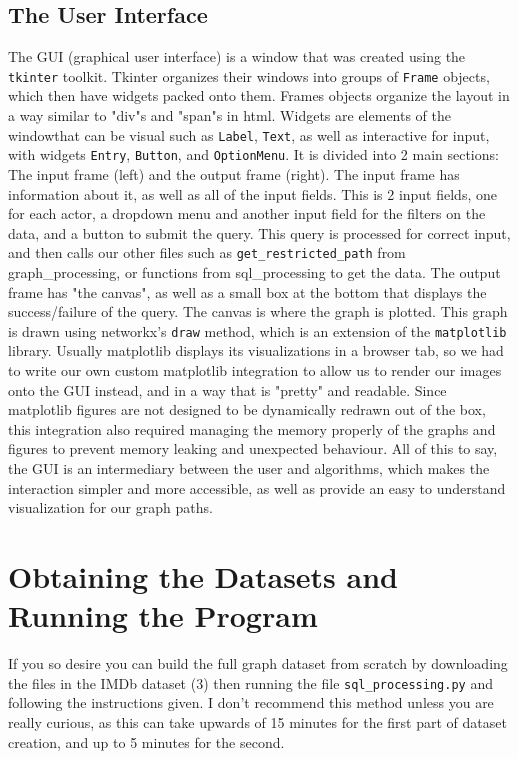 \documentclass{article}
\begin{document}
\subsection{The User Interface}
The GUI (graphical user interface) is a window that was created using the \verb!tkinter! toolkit. Tkinter organizes their windows into groups of \verb!Frame! objects, which then have widgets packed onto them. Frames objects organize the layout in a way similar to "div"s and "span"s in html. Widgets are elements of the windowthat can be visual such as \verb!Label!, \verb!Text!, as well as interactive for input, with widgets \verb!Entry!, \verb!Button!, and \verb!OptionMenu!. It is divided into 2 main sections: The input frame (left) and the output frame (right). The input frame has information about it, as well as all of the input fields. This is 2 input fields, one for each actor, a dropdown menu and another input field for the filters on the data, and a button to submit the query. This query is processed for correct input, and then calls our other files such as \verb!get_restricted_path! from graph\_processing, or functions from sql\_processing to get the data. The output frame has "the canvas", as well as a small box at the bottom that displays the success/failure of the query. The canvas is where the graph is plotted. This graph is drawn using networkx's \verb!draw! method, which is an extension of the \verb!matplotlib! library. Usually matplotlib displays its visualizations in a browser tab, so we had to write our own custom matplotlib integration to allow us to render our images onto the GUI instead, and in a way that is "pretty" and readable. Since matplotlib figures are not designed to be dynamically redrawn out of the box, this integration also required managing the memory properly of the graphs and figures to prevent memory leaking and unexpected behaviour. All of this to say, the GUI is an intermediary between the user and algorithms, which makes the interaction simpler and more accessible, as well as provide an easy to understand visualization for our graph paths.

\section{Obtaining the Datasets and Running the Program}
If you so desire you can build the full graph dataset from scratch by downloading the files in the IMDb dataset (3) then running the file \verb!sql_processing.py! and following the instructions given. I don't recommend this method unless you are really curious, as this can take upwards of 15 minutes for the first part of dataset creation, and up to 5 minutes for the second.
\end{document}
